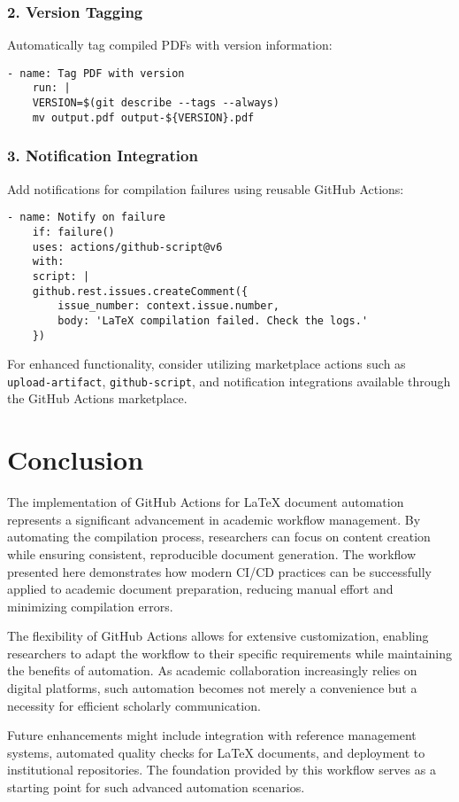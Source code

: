 \subsubsection{2. Version Tagging}
Automatically tag compiled PDFs with version information:
\begin{lstlisting}[breaklines=true]
	- name: Tag PDF with version
	run: |
	VERSION=$(git describe --tags --always)
	mv output.pdf output-${VERSION}.pdf
\end{lstlisting}

\subsubsection{3. Notification Integration}
Add notifications for compilation failures using reusable GitHub Actions:
\begin{lstlisting}[breaklines=true]
	- name: Notify on failure
	if: failure()
	uses: actions/github-script@v6
	with:
	script: |
	github.rest.issues.createComment({
		issue_number: context.issue.number,
		body: 'LaTeX compilation failed. Check the logs.'
	})
\end{lstlisting}

For enhanced functionality, consider utilizing marketplace actions such as \texttt{upload-artifact}, \texttt{github-script}, and notification integrations available through the GitHub Actions marketplace.

\section{Conclusion}


The implementation of GitHub Actions for LaTeX document automation represents a significant advancement in academic workflow management. By automating the compilation process, researchers can focus on content creation while ensuring consistent, reproducible document generation. The workflow presented here demonstrates how modern CI/CD practices can be successfully applied to academic document preparation, reducing manual effort and minimizing compilation errors.

The flexibility of GitHub Actions allows for extensive customization, enabling researchers to adapt the workflow to their specific requirements while maintaining the benefits of automation. As academic collaboration increasingly relies on digital platforms, such automation becomes not merely a convenience but a necessity for efficient scholarly communication.

Future enhancements might include integration with reference management systems, automated quality checks for LaTeX documents, and deployment to institutional repositories. The foundation provided by this workflow serves as a starting point for such advanced automation scenarios.


